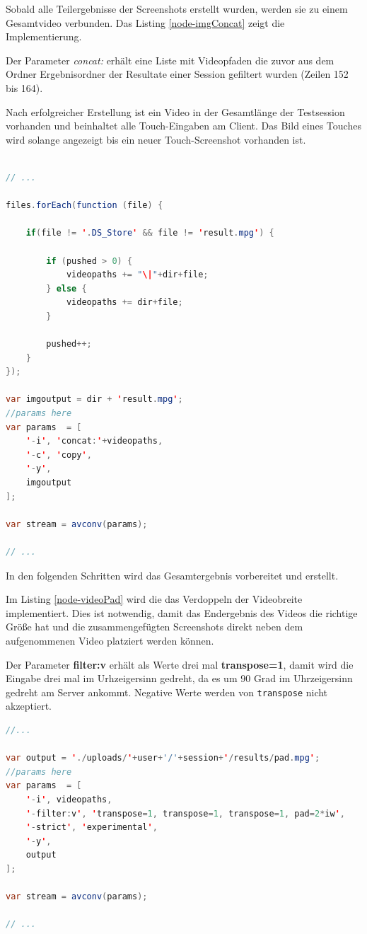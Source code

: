 Sobald alle Teilergebnisse der Screenshots erstellt wurden, werden sie zu einem Gesamtvideo verbunden. 
Das Listing \ref{node-imgConcat} zeigt die Implementierung. 

Der Parameter \textit{concat:} erhält eine Liste mit Videopfaden die zuvor aus dem Ordner Ergebnisordner der Resultate einer Session gefiltert wurden (Zeilen 152 bis 164). 

Nach erfolgreicher Erstellung ist ein Video in der Gesamtlänge der Testsession vorhanden und beinhaltet alle Touch-Eingaben am Client. 
Das Bild eines Touches wird solange angezeigt bis ein neuer Touch-Screenshot vorhanden ist. 

\begin{lstlisting}[label=node-imgConcat,language=Java, caption=Screenshot-Videos zu einem Videos konkatenieren, firstnumber=149]

// ...

files.forEach(function (file) {

	if(file != '.DS_Store' && file != 'result.mpg') {

		if (pushed > 0) {
			videopaths += "\|"+dir+file;
		} else {
			videopaths += dir+file;
		}
		
		pushed++;
	}
});

var imgoutput = dir + 'result.mpg';
//params here
var params  = [
	'-i', 'concat:'+videopaths,
	'-c', 'copy',
	'-y',
	imgoutput
];

var stream = avconv(params);

// ...
\end{lstlisting}

In den folgenden Schritten wird das Gesamtergebnis vorbereitet und erstellt. 

Im Listing \ref{node-videoPad} wird die das Verdoppeln der Videobreite implementiert. 
Dies ist notwendig, damit das Endergebnis des Videos die richtige Größe hat und die zusammengefügten Screenshots direkt neben dem aufgenommenen Video platziert werden können. 

Der Parameter \textbf{filter:v} erhält als Werte drei mal \textbf{transpose=1}, damit wird die Eingabe drei mal im Urhzeigersinn gedreht, da es um 90 Grad im Uhrzeigersinn gedreht am Server ankommt. %
Negative Werte werden von \texttt{transpose} nicht akzeptiert. 

\begin{lstlisting}[label=node-videoPad,language=Java, caption=Erstellung der Ergebnisgrundlage, firstnumber=196]
//...

var output = './uploads/'+user+'/'+session+'/results/pad.mpg';
//params here
var params  = [
	'-i', videopaths,
	'-filter:v', 'transpose=1, transpose=1, transpose=1, pad=2*iw',
	'-strict', 'experimental',
	'-y',
	output
];

var stream = avconv(params);

// ...
\end{lstlisting}

